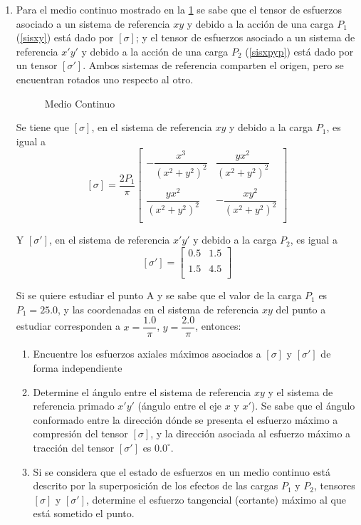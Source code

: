 \documentclass[../notas medios.tex]{subfiles}
\begin{document}
\begin{enumerate}
\item \label{punto22} Para el medio continuo mostrado  en la \cref{MedioCon}
se sabe que el tensor de esfuerzos asociado a un sistema de referencia $xy$ y debido a la acción de una carga $P_1$ (\cref{sisxy}) está dado por $[\sigma]$; y el tensor  de esfuerzos asociado a un sistema de referencia $x'y'$ y debido a la acción de una carga $P_2$ (\cref{sisxpyp})  está dado por un tensor $[\sigma']$. Ambos sistemas de referencia comparten el origen, pero se encuentran rotados uno respecto al otro.
%
\begin{figure}[H]
	\centering
		\hspace{2.0cm}
	\caption{ Medio Continuo}
	\label{MedioCon}
\end{figure}

Se tiene que $[\sigma]$, en el sistema de referencia $xy$ y debido a la carga $P_1$, es igual a
\[[\sigma] = \dfrac{2P_1}{\pi} \left[ \begin{array}{ccc}
- \dfrac{x^3}{\left(x^2+y^2 \right)^2} &  \dfrac{yx^2}{\left(x^2+y^2 \right)^2}\\ \\
 \dfrac{yx^2}{\left(x^2+y^2 \right)^2} &- \dfrac{xy^2}{\left(x^2+y^2 \right)^2}\\
\end{array}  \right]\]
 
Y $[\sigma']$, en el sistema de referencia $x'y'$ y debido a la carga $P_2$, es igual a
 \[[\sigma'] = \left[ \begin{array}{ccc}
0.5 & 1.5\\ \\
1.5 & 4.5\\
\end{array}  \right]\]

Si se quiere estudiar el punto A y se sabe que el valor de la carga $P_1$ es $P_1= 25.0$,  y las coordenadas  en el sistema de referencia $xy$ del punto a estudiar corresponden a $x=\dfrac{1.0}{\pi}$, $y=\dfrac{2.0}{\pi}$, entonces:
\begin{enumerate}
	\item Encuentre los esfuerzos axiales máximos asociados a $[\sigma]$ y
	$[\sigma']$ de forma independiente
	\item Determine el ángulo entre el sistema de referencia $xy$ y el sistema de
	referencia primado $x'y'$ (ángulo entre el eje $x$ y $x'$). Se sabe que el
	ángulo conformado entre la dirección dónde se presenta el esfuerzo máximo a
	compresión del tensor  $[\sigma]$, y la dirección asociada al esfuerzo máximo a tracción del tensor $[\sigma']$ es $0.0^{\circ}$.
	\item Si se considera que el estado de esfuerzos en un medio continuo está
	descrito por la superposición de los efectos de las cargas $P_1$ y $P_2$,
	tensores $[\sigma]$ y $[\sigma']$, determine el esfuerzo tangencial (cortante)
	máximo al que está sometido el punto.
\end{enumerate}


\end{enumerate}
\end{document}
